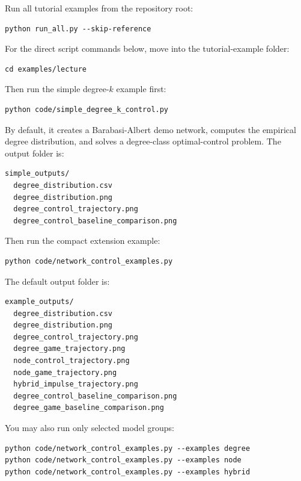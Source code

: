 \documentclass[11pt,a4paper]{article}
\begin{document}
Run all tutorial examples from the repository root:

\begin{lstlisting}[style=bash]
python run_all.py --skip-reference
\end{lstlisting}

For the direct script commands below, move into the tutorial-example folder:

\begin{lstlisting}[style=bash]
cd examples/lecture
\end{lstlisting}

Then run the simple degree-\(k\) example first:

\begin{lstlisting}[style=bash]
python code/simple_degree_k_control.py
\end{lstlisting}

By default, it creates a Barabasi-Albert demo network, computes the empirical degree distribution, and solves a degree-class optimal-control problem. The output folder is:

\begin{lstlisting}[style=text]
simple_outputs/
  degree_distribution.csv
  degree_distribution.png
  degree_control_trajectory.png
  degree_control_baseline_comparison.png
\end{lstlisting}

Then run the compact extension example:

\begin{lstlisting}[style=bash]
python code/network_control_examples.py
\end{lstlisting}

The default output folder is:

\begin{lstlisting}[style=text]
example_outputs/
  degree_distribution.csv
  degree_distribution.png
  degree_control_trajectory.png
  degree_game_trajectory.png
  node_control_trajectory.png
  node_game_trajectory.png
  hybrid_impulse_trajectory.png
  degree_control_baseline_comparison.png
  degree_game_baseline_comparison.png
\end{lstlisting}

You may also run only selected model groups:

\begin{lstlisting}[style=bash]
python code/network_control_examples.py --examples degree
python code/network_control_examples.py --examples node
python code/network_control_examples.py --examples hybrid
\end{lstlisting}
\end{document}
